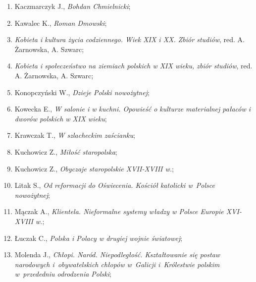\documentclass[a4paper,11pt]{article}
\begin{document}
\begin{enumerate}
\item Kaczmarczyk J., \textit{Bohdan Chmielnicki};



\item Kawalec K., \textit{Roman Dmowski};



\item \textit{Kobieta i kultura życia codziennego. Wiek XIX i XX. Zbiór
    studiów}, red. A. Żarnowska, A. Szwarc;



\item \textit{Kobieta i społeczeństwo na ziemiach polskich w XIX wieku,
    zbiór studiów}, red. A. Żarnowska, A. Szwarc;



\item Konopczyński W., \textit{Dzieje Polski nowożytnej};



\item Kowecka E., \textit{W salonie i w kuchni. Opowieść o kulturze
    materialnej pałaców i dworów polskich w XIX wieku};



\item Krawczak T., \textit{W szlacheckim zaścianku};



\item Kuchowicz Z., \textit{Miłość staropolska};



\item Kuchowicz Z., \textit{Obyczaje staropolskie XVII-XVIII w.};



\item Litak S., \textit{Od reformacji do Oświecenia. Kościół katolicki
    w~Polsce nowożytnej};



\item Mączak A., \textit{Klientela. Nieformalne systemy władzy w Polsce
    Europie XVI-XVIII w.};



\item Łuczak C., \textit{Polska i Polacy w drugiej wojnie światowej};



\item Molenda J., \textit{Chłopi. Naród. Niepodległość. Kształtowanie
    się postaw narodowych i~obywatelskich chłopów w~Galicji
    i~Królestwie polskim w~przededniu odrodzenia Polski};




\end{enumerate}
\end{document}
